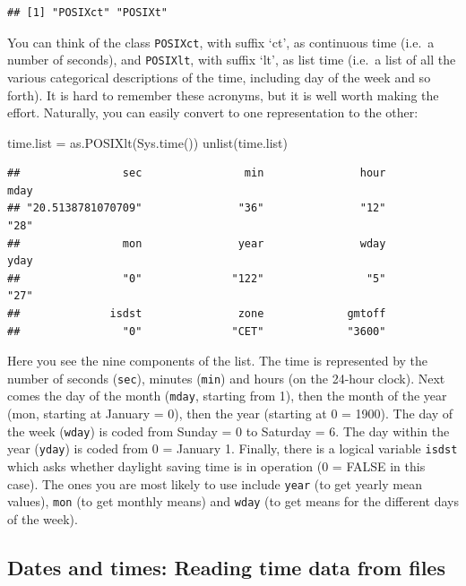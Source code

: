 \documentclass[
]{book}
\newenvironment{Shaded}{\begin{snugshade}}{\end{snugshade}}
\newcommand{\FunctionTok}[1]{\textcolor[rgb]{0.00,0.00,0.00}{#1}}
\newcommand{\NormalTok}[1]{#1}
\newcommand{\OtherTok}[1]{\textcolor[rgb]{0.56,0.35,0.01}{#1}}
\theoremstyle{definition}
\theoremstyle{definition}
\theoremstyle{definition}
\theoremstyle{definition}
\theoremstyle{remark}
\begin{document}
\begin{verbatim}
## [1] "POSIXct" "POSIXt"
\end{verbatim}

You can think of the class \texttt{POSIXct}, with suffix `ct', as continuous time (i.e.~a number of seconds), and
\texttt{POSIXlt}, with suffix `lt', as list time (i.e.~a list of all the various categorical descriptions of the time,
including day of the week and so forth). It is hard to remember these acronyms, but it is well worth making
the effort. Naturally, you can easily convert to one representation to the other:

\begin{Shaded}
\begin{Highlighting}[]
\NormalTok{time.list }\OtherTok{=} \FunctionTok{as.POSIXlt}\NormalTok{(}\FunctionTok{Sys.time}\NormalTok{())}
\FunctionTok{unlist}\NormalTok{(time.list)}
\end{Highlighting}
\end{Shaded}

\begin{verbatim}
##                sec                min               hour               mday 
## "20.5138781070709"               "36"               "12"               "28" 
##                mon               year               wday               yday 
##                "0"              "122"                "5"               "27" 
##              isdst               zone             gmtoff 
##                "0"              "CET"             "3600"
\end{verbatim}

Here you see the nine components of the list. The time is represented by the number of seconds (\texttt{sec}), minutes (\texttt{min}) and hours (on the 24-hour clock). Next comes the day of the month (\texttt{mday}, starting from 1), then the month of the year (mon, starting at January = 0), then the year (starting at 0 = 1900). The day of the week (\texttt{wday}) is coded from Sunday = 0 to Saturday = 6. The day within the year (\texttt{yday}) is coded from 0 = January 1. Finally, there is a logical variable \texttt{isdst} which asks whether daylight saving time is in operation (0 = FALSE in this case). The ones you are most likely to use include \texttt{year} (to get yearly mean values), \texttt{mon} (to get monthly means) and \texttt{wday} (to get means for the different days of the week).

\hypertarget{dates-and-times-reading-time-data-from-files}{%
\subsection{Dates and times: Reading time data from files}\label{dates-and-times-reading-time-data-from-files}}
\end{document}

